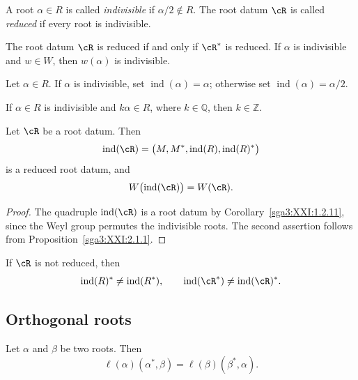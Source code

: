 \begin{definition}\label{sga3:XXI:2.1.3}
A root \(\alpha\in R\) is called \emph{indivisible} if
\(\alpha/2\notin R\). The root datum \(\cR\) is called
\emph{reduced} if every root is indivisible.
\end{definition}

The root datum \(\cR\) is reduced if and only if \(\cR^\ast\) is
reduced. If \(\alpha\) is indivisible and \(w\in W\), then
\(w(\alpha)\) is indivisible.

\begin{definition}\label{sga3:XXI:2.1.4}
Let \(\alpha\in R\). If \(\alpha\) is indivisible, set
\(\operatorname{ind}(\alpha)=\alpha\); otherwise set
\(\operatorname{ind}(\alpha)=\alpha/2\).
\end{definition}

\begin{corollary}\label{sga3:XXI:2.1.5}
If \(\alpha\in R\) is indivisible and \(k\alpha\in R\), where
\(k\in\mathbb Q\), then \(k\in\mathbb Z\).
\end{corollary}

\begin{proposition}\label{sga3:XXI:2.1.6}
Let \(\cR\) be a root datum. Then
\[
 \operatorname{ind}(\cR)
 =\bigl(M,M^\ast,\operatorname{ind}(R),
         \operatorname{ind}(R)^\ast\bigr)
\]
is a reduced root datum, and
\[
 W\bigl(\operatorname{ind}(\cR)\bigr)=W(\cR).
\]
\end{proposition}

\begin{proof}
The quadruple \(\operatorname{ind}(\cR)\) is a root datum by
Corollary~\ref{sga3:XXI:1.2.11}, since the Weyl group permutes the
indivisible roots. The second assertion follows from
Proposition~\ref{sga3:XXI:2.1.1}.
\end{proof}

\begin{remark}\label{sga3:XXI:2.1.7}
If \(\cR\) is not reduced, then
\[
 \operatorname{ind}(R)^\ast\neq\operatorname{ind}(R^\ast),
 \qquad
 \operatorname{ind}(\cR^\ast)\neq\operatorname{ind}(\cR)^\ast.
\]
\end{remark}

\subsection{Orthogonal roots}

\begin{lemma}\label{sga3:XXI:2.2.1}
Let \(\alpha\) and \(\beta\) be two roots. Then
\begin{equation}
 \ell(\alpha)(\alpha^\ast,\beta)
 =\ell(\beta)(\beta^\ast,\alpha).
 \tag{11}\label{sga3:XXI:eq:11}
\end{equation}
\end{lemma}

